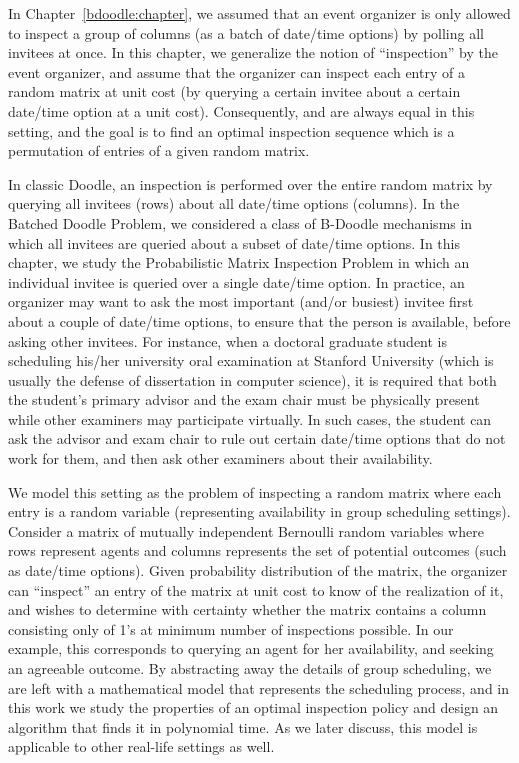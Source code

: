 \label{matrix:chapter}

In Chapter~\ref{bdoodle:chapter}, we assumed that an event organizer is only allowed to inspect a group of columns (as a batch of date/time options) by polling all invitees at once.
In this chapter, we generalize the notion of ``inspection'' by the event organizer, and assume that the organizer can inspect each entry of a random matrix at unit cost (by querying a certain invitee about a certain date/time option at a unit cost).
Consequently, \Times and \Inconveniences are always equal in this setting, and the goal is to find an optimal inspection sequence which is a permutation of entries of a given random matrix.

In classic Doodle, an inspection is performed over the entire random matrix by querying all invitees (rows) about all date/time options (columns).
In the Batched Doodle Problem, we considered a class of B-Doodle mechanisms in which all invitees are queried about a subset of date/time options.
In this chapter, we study the Probabilistic Matrix Inspection Problem in which an individual invitee is queried over a single date/time option. In practice, an organizer may want to ask the most important (and/or busiest) invitee first about a couple of date/time options, to ensure that the person is available, before asking other invitees. For instance, when a doctoral graduate student is scheduling his/her university oral examination at Stanford University (which is usually the defense of dissertation in computer science), it is required that both the student's primary advisor and the exam chair must be physically present while other examiners may participate virtually. %
In such cases, the student can ask the advisor and exam chair to rule out certain date/time options that do not work for them, and then ask other examiners about their availability. 

We model this setting as the problem of inspecting a random matrix where each entry is a random variable (representing availability in group scheduling settings). 
Consider a matrix of mutually independent Bernoulli random variables where rows represent agents and columns represents the set of potential outcomes (such as date/time options). 
Given probability distribution of the matrix, the organizer can ``inspect'' an entry of the matrix at unit cost to know of the realization of it, and wishes to determine with certainty whether the matrix contains a column consisting only of 1's at minimum number of inspections possible. In our example, this corresponds to querying an agent for her availability, and seeking an agreeable outcome.
By abstracting away the details of group scheduling, we are left with a mathematical model that represents the scheduling process, and in this work we study the properties of an optimal inspection policy and design an algorithm that finds it in polynomial time. As we later discuss, this model is applicable to other real-life settings as well.

